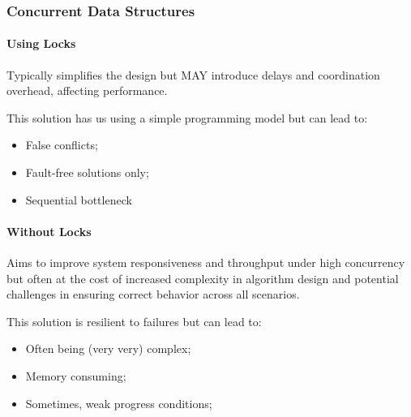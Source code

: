         \subsubsection{Concurrent Data Structures}
        \begin{minipage}{0.45\textwidth}
            \paragraph{Using Locks} Typically simplifies the design but MAY introduce delays and coordination overhead, affecting performance.\\ %
            \begin{center}
            \end{center}
            \par This solution has us using a simple programming model but can lead to:
            \begin{itemize}
                \item False conflicts;
                \item Fault-free solutions only;
                \item Sequential bottleneck
            \end{itemize}
        \end{minipage}
        \hfill\vrule\hfill
        \begin{minipage}{0.45\textwidth}
            \paragraph{Without Locks} Aims to improve system responsiveness and throughput under high concurrency but often at the cost of increased complexity in algorithm design and potential challenges in ensuring correct behavior across all scenarios.\\ %
            \begin{center}
            \end{center}
            \par This solution is resilient to failures but can lead to:
            \begin{itemize}
                \item Often being (very very) complex;
                \item Memory consuming;
                \item Sometimes, weak progress conditions;
            \end{itemize}
        \end{minipage}
%
\clearpage
%
\begin{minipage}[t]{0.45\textwidth}
    \centering
\end{minipage}
\hfill\vrule\hfill
\begin{minipage}[t]{0.45\textwidth}
    \centering
\end{minipage}
